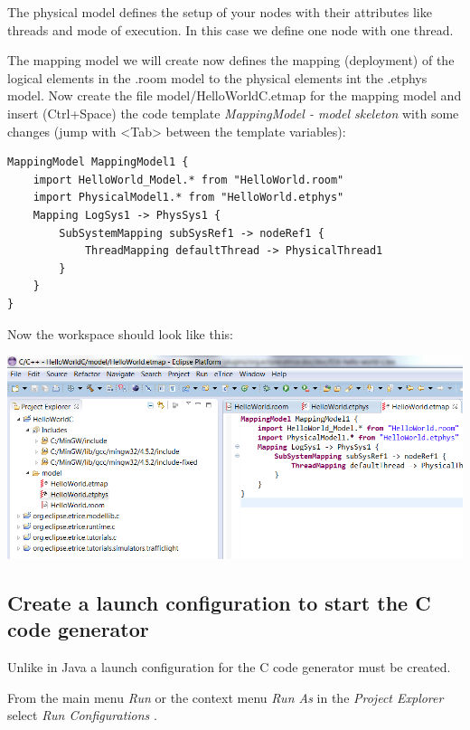 The physical model defines the setup of your nodes with their attributes like threads and mode of execution. In this case we define one node with one thread. 

The mapping model we will create now defines the mapping (deployment) of the logical elements in the .room model to the physical elements int the .etphys model. Now create the file model/HelloWorldC.etmap for the mapping model and insert (Ctrl+Space) the code template \emph{MappingModel - model skeleton} with some changes (jump with <Tab> between the template variables):

\begin{lstlisting}[language=etMap]
MappingModel MappingModel1 {
	import HelloWorld_Model.* from "HelloWorld.room"
	import PhysicalModel1.* from "HelloWorld.etphys"
	Mapping LogSys1 -> PhysSys1 {
		SubSystemMapping subSysRef1 -> nodeRef1 {
			ThreadMapping defaultThread -> PhysicalThread1
		}
	}
}
\end{lstlisting}

Now the workspace should look like this:

\includegraphics{images/016-HelloWorldC05.png}



\subsection{Create a launch configuration to start the C code generator}

Unlike in Java a launch configuration for the C code generator must be created.

From the main menu \textit{Run} or the context menu \textit{Run As} in the \emph{Project Explorer} select \textit{Run Configurations} .


